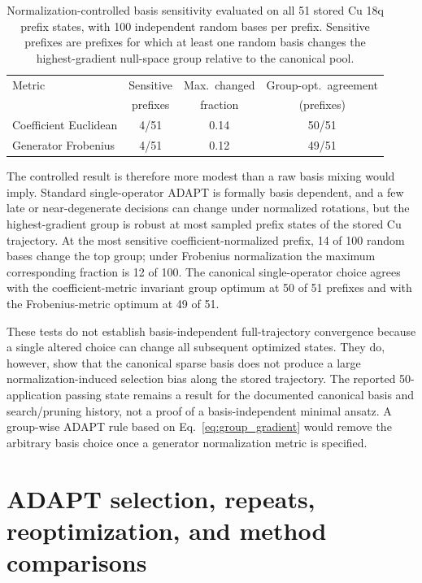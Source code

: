 \documentclass[
 aip,
 jcp,
 amsmath,amssymb,
 preprint
]{revtex4-2}
\begin{document}
\begin{table}[htbp]
\centering
\small
\caption{Normalization-controlled basis sensitivity evaluated on all 51 stored Cu 18q prefix states, with 100 independent random bases per prefix. Sensitive prefixes are prefixes for which at least one random basis changes the highest-gradient null-space group relative to the canonical pool.}
\label{tab:basis_sensitivity}
\begin{tabular}{lccc}
\toprule
Metric & Sensitive & Max.\ changed & Group-opt.\ agreement\\
& prefixes & fraction & (prefixes)\\
\midrule
Coefficient Euclidean & 4/51 & 0.14 & 50/51\\
Generator Frobenius & 4/51 & 0.12 & 49/51\\
\bottomrule
\end{tabular}
\end{table}

The controlled result is therefore more modest than a raw basis mixing would imply.
Standard single-operator ADAPT is formally basis dependent, and a few late or near-degenerate decisions can change under normalized rotations, but the highest-gradient group is robust at most sampled prefix states of the stored Cu trajectory.
At the most sensitive coefficient-normalized prefix, 14 of 100 random bases change the top group; under Frobenius normalization the maximum corresponding fraction is 12 of 100.
The canonical single-operator choice agrees with the coefficient-metric invariant group optimum at 50 of 51 prefixes and with the Frobenius-metric optimum at 49 of 51.

These tests do not establish basis-independent full-trajectory convergence because a single altered choice can change all subsequent optimized states.
They do, however, show that the canonical sparse basis does not produce a large normalization-induced selection bias along the stored trajectory.
The reported 50-application passing state remains a result for the documented canonical basis and search/pruning history, not a proof of a basis-independent minimal ansatz.
A group-wise ADAPT rule based on Eq.~\ref{eq:group_gradient} would remove the arbitrary basis choice once a generator normalization metric is specified.

\section{ADAPT selection, repeats, reoptimization, and method comparisons}
\end{document}
